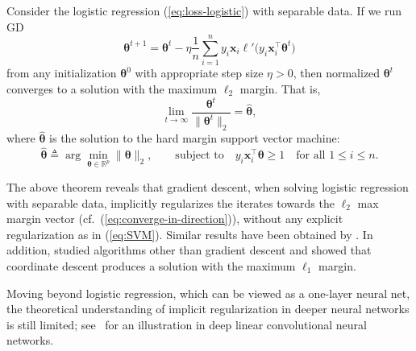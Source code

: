 \begin{thm}Consider
the logistic regression (\ref{eq:loss-logistic}) with separable data.
If we run GD
\[
\bm{\theta}^{t+1}=\bm{\theta}^{t}-\eta\frac{1}{n}\sum_{i=1}^{n}y_{i}\bm{x}_{i}\ell'\big(y_{i}\bm{x}_{i}^\top \bm{\theta}^{t}\big)
\]
from any initialization $\bm{\theta}^{0}$ with appropriate step size
$\eta>0$, %
then normalized $\bm{\theta}^{t}$ converges to a solution with the maximum $\ell_2$ margin. That is,
\begin{equation}
\lim_{t\to\infty}\frac{\bm{\theta}^{t}}{\|\bm{\theta}^{t}\|_{2}}=\hat{\bm{\theta}},\label{eq:converge-in-direction}
\end{equation}
where $\hat{\bm{\theta}}$ is the solution to the hard margin support
vector machine: %
\begin{equation}
\hat{\bm{\theta}}\triangleq\arg\min_{\bm{\theta}\in\mathbb{R}^{p}}\|\bm{\theta}\|_{2},\qquad\text{subject to}\quad y_{i}\bm{x}_{i}^\top \bm{\theta} \geq1\quad\text{for all }1\leq i\leq n.\label{eq:SVM}
\end{equation}
\end{thm}

The above theorem reveals that gradient descent, when solving logistic
regression with separable data, implicitly regularizes the iterates towards
the $\ell_{2}$ max margin vector (cf.~(\ref{eq:converge-in-direction})),
without any explicit regularization as in (\ref{eq:SVM}). Similar
results have been obtained by \cite{ji2018risk}. In addition, \cite{gunasekar2018characterizing}
studied algorithms other than gradient descent and showed that coordinate descent produces a solution with the maximum $\ell_1$ margin.

Moving beyond logistic regression, which can be viewed as a one-layer neural net, the theoretical understanding of implicit regularization in deeper neural networks is still limited; see~\cite{gunasekar2018implicit} for an illustration in deep linear convolutional neural networks.

